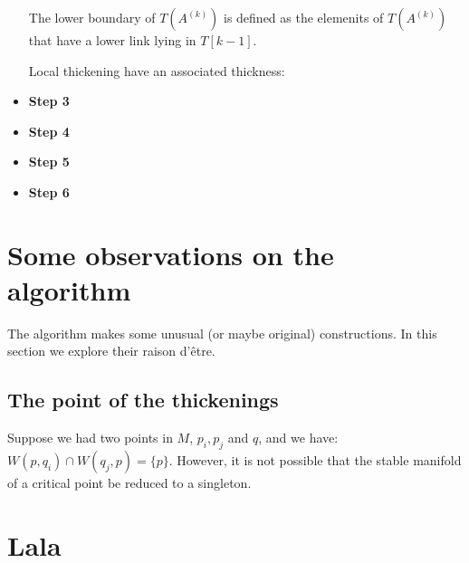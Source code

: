 \begin{itemize}
\begin{definition}
            The lower boundary of $T(A^{(k)})$
            is defined as the elemenits of $T(A^{(k)})$ that have a lower link lying in $T[k-1]$.
        \end{definition}

        Local thickening have an associated thickness:

        \begin{definition}
        \end{definition}

    \item {\bf Step 3}
        
    \item {\bf Step 4}

    \item {\bf Step 5}

    \item {\bf Step 6}

\end{itemize}

\section{Some observations on the algorithm}

The algorithm makes some unusual (or maybe original) constructions. In this
section we explore their raison d'\^etre.

\subsection{The point of the thickenings}

Suppose we had two points in $M$, $p_i,p_j$ and $q$, 
and we have: $W(p,q_i)\cap W(q_j,p)=\{p\}$.
However, it is not possible that the stable manifold of a critical point be reduced to a
singleton.


\section{Lala}
